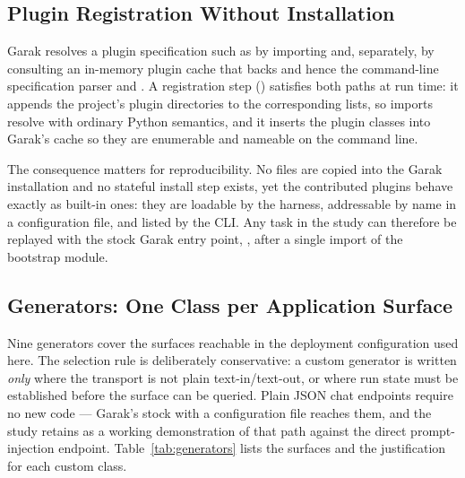 \subsection{Plugin Registration Without Installation}
\label{sec:arch:registration}

Garak resolves a plugin specification such as
 by importing 
and, separately, by consulting an in-memory plugin cache that backs
 and hence the command-line specification parser
and . A registration step
() satisfies both paths at run time: it
appends the project's plugin directories to the corresponding
 lists, so
imports resolve with ordinary Python semantics, and it inserts the
plugin classes into Garak's cache so they are enumerable and nameable on
the command line.

The consequence matters for reproducibility. No files are copied into
the Garak installation and no stateful install step exists, yet the
contributed plugins behave exactly as built-in ones: they are loadable
by the harness, addressable by name in a configuration file, and listed
by the CLI. Any task in the study can therefore be replayed with the
stock Garak entry point, ,
after a single import of the bootstrap module.

\subsection{Generators: One Class per Application Surface}
\label{sec:arch:generators}

Nine generators cover the surfaces reachable in the deployment
configuration used here. The selection rule is deliberately
conservative: a custom generator is written \emph{only} where the
transport is not plain text-in/text-out, or where run state must be
established before the surface can be queried. Plain JSON chat endpoints
require no new code --- Garak's stock  with a
configuration file reaches them, and the study retains
 as a working demonstration
of that path against the direct prompt-injection endpoint. Table~\ref{tab:generators}
lists the surfaces and the justification for each custom class.

